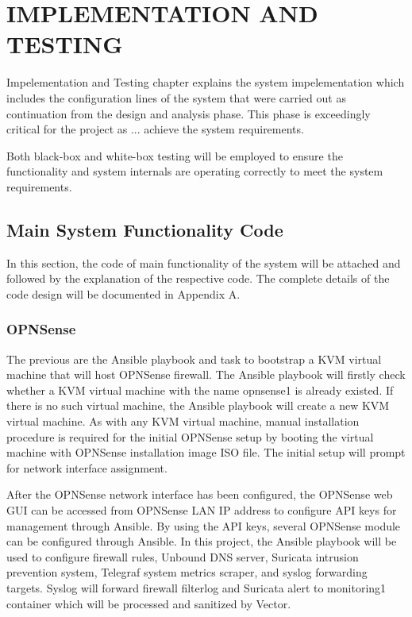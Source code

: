 \documentclass[../index.tex]{subfiles}
\begin{document}
\chapter{IMPLEMENTATION AND TESTING}

Impelementation and Testing chapter explains the system impelementation which includes the
configuration lines of the system that were carried out as continuation from the design and analysis
phase. This phase is exceedingly critical for the project as ... achieve the system requirements.

Both black-box and white-box testing will be employed to ensure the functionality and system
internals are operating correctly to meet the system requirements.

\section{Main System Functionality Code}

In this section, the code of main functionality of the system will be attached and followed by the
explanation of the respective code. The complete details of the code design will be documented in
Appendix A.

\subsection{OPNSense}

The previous are the Ansible playbook and task to bootstrap a KVM virtual machine that will host
OPNSense firewall. The Ansible playbook will firstly check whether a KVM virtual machine with the
name opnsense1 is already existed. If there is no such virtual machine, the Ansible playbook will
create a new KVM virtual machine. As with any KVM virtual machine, manual installation procedure is
required for the initial OPNSense setup by booting the virtual machine with OPNSense installation
image ISO file. The initial setup will prompt for network interface assignment.

After the OPNSense network interface has been configured, the OPNSense web GUI can be accessed from
OPNSense LAN IP address to configure API keys for management through Ansible. By using the API keys,
several OPNSense module can be configured through Ansible. In this project, the Ansible playbook
will be used to configure firewall rules, Unbound DNS server, Suricata intrusion prevention system,
Telegraf system metrics scraper, and syslog forwarding targets. Syslog will forward firewall
filterlog and Suricata alert to monitoring1 container which will be processed and sanitized by
Vector.
\end{document}
